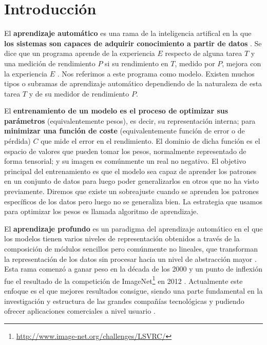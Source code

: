 \section{Introducción}

El \textbf{aprendizaje automático} es una rama de la inteligencia artifical en la que \textbf{los sistemas son capaces de adquirir conocimiento a partir de datos} \cite{GoodFellowBook}. Se dice que un programa aprende de la experiencia $E$ respecto de alguna tarea $T$ y una medición de rendimiento $P$ si su rendimiento en $T$, medido por $P$, mejora con la experiencia $E$ \cite{mitchell1997machine}. Nos referimos a este programa como modelo. Existen muchos tipos o subramas de aprendizaje automático dependiendo de la naturaleza de esta tarea $T$ y de su medidor de rendimiento $P$. 

El \textbf{entrenamiento de un modelo es el proceso de optimizar sus parámetros} (equivalentemente pesos), es decir, su representación interna; para \textbf{minimizar una función de coste} (equivalentemente función de error o de pérdida) $C$ que mide el error en el rendimiento. El dominio de dicha función es el espacio de valores que pueden tomar los pesos, normalmente representado de forma tensorial; y su imagen es comúnmente un real no negativo. El objetivo principal del entrenamiento es que el modelo sea capaz de aprender los patrones en un conjunto de datos para luego poder generalizarlos en otros que no ha visto previamente. Diremos que existe un sobreajuste cuando se aprenden los patrones específicos de los datos pero luego no se generaliza bien. La estrategia que usamos para optimizar los pesos es llamada algoritmo de aprendizaje.

El \textbf{aprendizaje profundo} es un paradigma del aprendizaje automático en el que los modelos tienen varios niveles de representación obtenidos a través de la composición de módulos sencillos pero comúnmente no lineales, que transforman la representación de los datos sin procesar hacia un nivel de abstracción mayor \cite{lecun2015deep}. Esta rama comenzó a ganar peso en la década de los 2000 y un punto de inflexión fue el resultado de la competición de ImageNet\footnote{\url{http://www.image-net.org/challenges/LSVRC/}} en 2012 \cite{NIPS2012_c399862d}. Actualmente este enfoque es el que mejores resultados consigue, siendo una parte fundamental en la investigación y estructura de las grandes compañías tecnológicas y pudiendo ofrecer aplicaciones comerciales a nivel usuario \cite{Sejnowski18, lecunnDeepForAI}.

